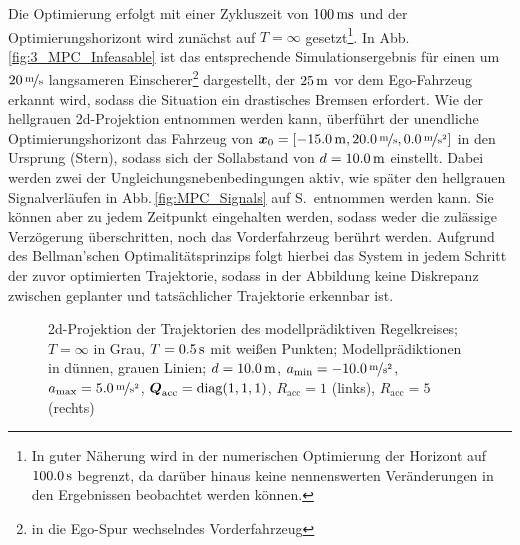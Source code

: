 Die Optimierung erfolgt mit einer Zykluszeit von $\unit[100]{ms}$ und der Optimierungshorizont wird zunächst auf $T = \infty$ gesetzt\footnote{In guter Näherung wird in der numerischen Optimierung der Horizont auf $\unit[100.0]{s}$ begrenzt, da darüber hinaus keine nennenswerten Veränderungen in den Ergebnissen beobachtet werden können.}. In Abb.\,\ref{fig:3_MPC_Infeasable} ist das entsprechende Simulationsergebnis für einen um $\unitfrac[20]{m}{s}$ langsameren Einscherer\footnote{in die Ego-Spur wechselndes Vorderfahrzeug} dargestellt, der $\unit[25]{m}$ vor dem Ego-Fahrzeug erkannt wird, sodass die Situation ein drastisches Bremsen erfordert. Wie der hellgrauen 2d-Projektion entnommen werden kann, überführt der unendliche Optimierungshorizont das Fahrzeug von $\bs x_0 = [\unit[-15.0]{m}, \unitfrac[20.0]{m}{s}, \unitfrac[0.0]{m}{s^2}]$ in den Ursprung (Stern), sodass sich der Sollabstand von $d=\unit[10.0]{m}$ einstellt. Dabei werden zwei der Ungleichungsnebenbedingungen aktiv, wie später den hellgrauen Signalverläufen in Abb.\,\ref{fig:MPC_Signals} auf S.\,\pageref{fig:MPC_Signals} entnommen werden kann. Sie können aber zu jedem Zeitpunkt eingehalten werden, sodass weder die zulässige Verzögerung überschritten, noch das Vorderfahrzeug berührt werden. Aufgrund des Bellman'schen Optimalitätsprinzips folgt hierbei das System in jedem Schritt der zuvor optimierten Trajektorie, sodass in der Abbildung keine Diskrepanz zwischen geplanter und tatsächlicher Trajektorie erkennbar ist.

\begin{figure}[ht]
	\def\xlabel{$\Delta x$ in $\unit{m}$}
	\def\vlabel{$\Delta v$ in $\unitfrac{m}{s}$}	
	\def\alabel{$\mathcal{C}_\infty$}
	\def\blabel{ICS}
	\def\x0{$\bs x_0$}
	
	\def\dots{$(\ldots)$}
	
    \caption[Trajektorien des modellprädiktiven ACC-Regelkreises]{2d-Projektion der Trajektorien des modellprädiktiven Regelkreises; $T = \infty$ in Grau, $T=\unit[0.5]{s}$ mit weißen Punkten; Modellprädiktionen in dünnen, grauen Linien; $d = \unit[10.0]{m}$,
$a_{\min} = -\unitfrac[10.0]{m}{s^2}$,
$a_{\max} = \unitfrac[5.0]{m}{s^2}$,
$\boldsymbol{Q}_\text{acc} = \text{diag}(1,1,1)$,
$R_\text{acc} = 1$ (links), $R_\text{acc} = 5$ (rechts)}
\end{figure}

